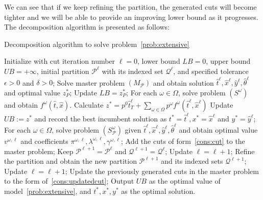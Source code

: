 \documentclass[11pt]{article}
\begin{document}
	We can see that if we keep refining the partition, the generated cuts will become tighter and we will be able to provide an improving lower bound as it progresses. The decomposition algorithm is presented as follows:
	\begin{algorithm}
		\caption{Decomposition algorithm to solve problem~\eqref{prob:extensive}}
		\label{alg:Cut}
		\begin{algorithmic}[1]
			\State Initialize with cut iteration number \(\ell = 0\), lower bound \(LB = 0\), upper bound \(UB = +\infty\), initial partition \(\mathcal{P}^\ell\) with its indexed set \(\mathcal{Q}^\ell\), and specified tolerance \(\epsilon > 0\) and \(\delta > 0\);
			\State Solve master problem \((M_{\mathcal{P}})\) and obtain solution \(\hat{t}^{\ell}, \hat{x}^{\ell}, \hat{y}^{\ell}, \hat{\theta}^{\ell}\) and optimal value \(z_{P}^*\);
			\State Update \(LB = z_{P}^*\);
			\EndIf
			\State For each \(\omega \in \Omega\), solve problem \((S^\omega)\) and obtain \(f^{\omega}(\hat{t},\hat{x})\). 
			\State Calculate \(z^* = p^0 \hat{t}^\ell_T + \sum_{\omega \in \Omega} p^\omega f^{\omega}(\hat{t}^\ell,\hat{x}^\ell)\)
			\State Update \(UB := z^*\) and record the best incumbent solution as \(t^* = \hat{t}^\ell, x^* = \hat{x}^\ell\) and \(y^* = \hat{y}^\ell\);
			\EndIf
			\State For each \(\omega \in \Omega\), solve problem \((S_{\mathcal{P}}^\omega)\) given \(\hat{t}^{\ell}, \hat{x}^{\ell}, \hat{y}^{\ell}, \hat{\theta}^{\ell}\) and obtain optimal value \(v^{\omega,\ell}\) and coefficients \(\pi^{\omega,\ell}, \lambda^{\omega,\ell}, \gamma^{\omega,\ell}\);
			\State Add the cuts of form~\eqref{cons:cut} to the master problem;
			\State Keep \(\mathcal{P}^{\ell + 1} = \mathcal{P}^\ell\) and \(\mathcal{Q}^{\ell + 1} = \mathcal{Q}^\ell\); 
			\State Update \(\ell = \ell + 1\);
			\Else
			\State Refine the partition and obtain the new partition \(\mathcal{P}^{\ell + 1}\) and its indexed sets \(\mathcal{Q}^{\ell + 1}\);
			\State Update \(\ell = \ell + 1\);
			\State Update the previously generated cuts in the master problem to the form of~\eqref{cons:updatedcut};
			\EndIf
			\vspace{0.1cm}
			\State Output \(UB\) as the optimal value of model~\eqref{prob:extensive}, and \(t^*, x^*,y^*\) as the optimal solution.
		\end{algorithmic}
	\end{algorithm}
\end{document}
